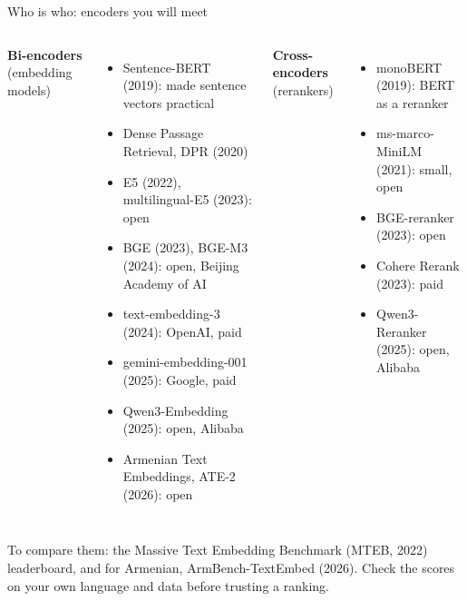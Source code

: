 \documentclass[aspectratio=169]{beamer}
\begin{document}
\begin{frame}{Who is who: encoders you will meet}
  \vspace{0.3em}
  \begin{columns}[T]
      \textbf{\color{popblue}Bi-encoders} {\small (embedding models)}
      \begin{itemize}\footnotesize
        \item Sentence-BERT (2019): made sentence vectors practical
        \item Dense Passage Retrieval, DPR (2020)
        \item E5 (2022), multilingual-E5 (2023): open
        \item BGE (2023), BGE-M3 (2024): open, Beijing Academy of AI
        \item text-embedding-3 (2024): OpenAI, paid
        \item gemini-embedding-001 (2025): Google, paid
        \item Qwen3-Embedding (2025): open, Alibaba
        \item Armenian Text Embeddings, ATE-2 (2026): open
      \end{itemize}
      \textbf{\color{armred}Cross-encoders} {\small (rerankers)}
      \begin{itemize}\footnotesize
        \item monoBERT (2019): BERT as a reranker
        \item ms-marco-MiniLM (2021): small, open
        \item BGE-reranker (2023): open
        \item Cohere Rerank (2023): paid
        \item Qwen3-Reranker (2025): open, Alibaba
      \end{itemize}
  \end{columns}

  \vspace{0.6em}
  {\footnotesize\color{gray}To compare them: the Massive Text Embedding Benchmark (MTEB, 2022) leaderboard, and for
  Armenian, ArmBench-TextEmbed (2026). Check the scores on your own language and data before trusting a ranking.}
\end{frame}
\end{document}
